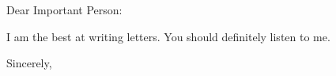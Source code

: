 \documentclass{letter}
\begin{document}
\begin{letter}{}
\opening{Dear Important Person:}
I am the best at writing letters. You should definitely listen to me.

\lipsum[1-4]

%
\closing{Sincerely,}
\end{letter}
\end{document}
